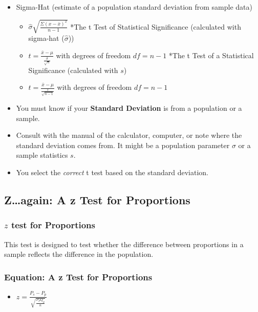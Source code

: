 \documentclass[]{article}
\begin{document}
\begin{itemize}
\itemsep1pt\parskip0pt
\item
  Sigma-Hat (estimate of a population standard deviation from sample
  data)

  \begin{itemize}
  \itemsep1pt\parskip0pt
  \item
    $\hat{\sigma} \sqrt{\frac{\Sigma(x - \bar{x})^2}{n-1}}$ *The t Test
    of Statistical Significance (calculated with sigma-hat
    ($\hat{\sigma}$))
  \item
    $t = \frac{\bar{x}-\mu}{\frac{\hat{\sigma}}{\sqrt{n}}}$ with degrees
    of freedom $df = n-1$ *The t Test of a Statistical Significance
    (calculated with $s$)
  \item
    $t = \frac{\bar{x}-\mu}{\frac{s}{\sqrt{n -1}}}$ with degrees of
    freedom $df = n-1$
  \end{itemize}
\item
  You must know if your \textbf{Standard Deviation} is from a population
  or a sample.
\item
  Consult with the manual of the calculator, computer, or note where the
  standard deviation comes from. It might be a population parameter
  $\sigma$ or a sample statistics $s$.
\item
  You select the \emph{correct} t test based on the standard deviation.
\end{itemize}

\subsection{Z\ldots{}again: A z Test for
Proportions}\label{zagain-a-z-test-for-proportions}

\subsubsection{$z$ test for Proportions}\label{z-test-for-proportions}

This test is designed to test whether the difference between proportions
in a sample reflects the difference in the population.

\subsubsection{Equation: A z Test for
Proportions}\label{equation-a-z-test-for-proportions}

\begin{itemize}
\itemsep1pt\parskip0pt
\item
  $z = \frac{P_s - P_p}{\sqrt{\frac{P_PQ_p}{n}}}$
\end{itemize}
\end{document}
